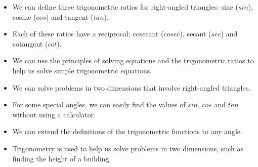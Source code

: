 \begin{itemize}[noitemsep]
\item We can define three trigonometric ratios for right-angled triangles: sine ($sin$), cosine ($cos$) and tangent ($tan$).
\item Each of these ratios have a reciprocal: cosecant ($cosec$), secant ($sec$) and cotangent ($cot$).
\item We can use the principles of solving equations and the trigonometric ratios to help us solve simple trigonometric equations.
\item We can solve problems in two dimensions that involve right-angled triangles.
\item For some special angles, we can easily find the values of $sin$, $cos$ and $tan$ without using a calculator.
\item We can extend the definitions of the trigonometric functions to any angle.
\item Trigonometry is used to help us solve problems in two dimensions, such as finding the height of a building.
\end{itemize}


